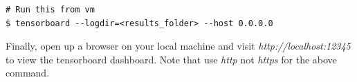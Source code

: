 \begin{lstlisting}
# Run this from vm
$ tensorboard --logdir=<results_folder> --host 0.0.0.0
\end{lstlisting}

Finally, open up a browser on your local machine and visit \textit{http://localhost:12345} to view the tensorboard dashboard. Note that use \textit{http} not \textit{https} for the above command.

\begin{enumerate}[(a)]

	

	

  

  

  

\end{enumerate}
